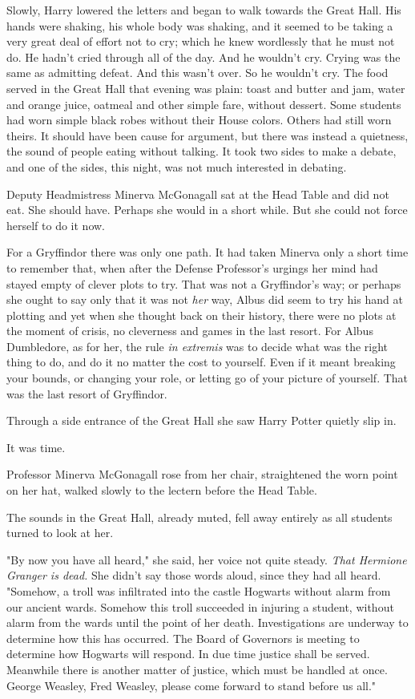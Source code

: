 Slowly, Harry lowered the letters and began to walk towards the Great Hall. His
hands were shaking, his whole body was shaking, and it seemed to be taking a
very great deal of effort not to cry; which he knew wordlessly that he must not
do. He hadn't cried through all of the day. And he wouldn't cry. Crying was the
same as admitting defeat. And this wasn't over. So he wouldn't cry.
\sbreak
The food served in the Great Hall that evening was plain: toast and
butter and jam, water and orange juice, oatmeal and other simple fare, without
dessert. Some students had worn simple black robes without their House colors.
Others had still worn theirs. It should have been cause for argument, but there
was instead a quietness, the sound of people eating without talking. It took
two sides to make a debate, and one of the sides, this night, was not much
interested in debating.

Deputy Headmistress Minerva McGonagall sat at the Head Table and did not eat.
She should have. Perhaps she would in a short while. But she could not force
herself to do it now.

For a Gryffindor there was only one path. It had taken Minerva only a short
time to remember that, when after the Defense Professor's urgings her mind had
stayed empty of clever plots to try. That was not a Gryffindor's way; or
perhaps she ought to say only that it was not \emph{her} way, Albus did seem to
try his hand at plotting{\el} and yet when she thought back on their
history, there were no plots at the moment of crisis, no cleverness and games
in the last resort. For Albus Dumbledore, as for her, the rule \emph{in
extremis} was to decide what was the right thing to do, and do it no matter the
cost to yourself. Even if it meant breaking your bounds, or changing your role,
or letting go of your picture of yourself. That was the last resort of
Gryffindor.

Through a side entrance of the Great Hall she saw Harry Potter quietly slip in.

It was time.

Professor Minerva McGonagall rose from her chair, straightened the worn point
on her hat, walked slowly to the lectern before the Head Table.

The sounds in the Great Hall, already muted, fell away entirely as all students
turned to look at her.

"By now you have all heard," she said, her voice not quite steady. \emph{That
Hermione Granger is dead.} She didn't say those words aloud, since they had all
heard. "Somehow, a troll was infiltrated into the castle Hogwarts without alarm
from our ancient wards. Somehow this troll succeeded in injuring a student,
without alarm from the wards until the point of her death. Investigations are
underway to determine how this has occurred. The Board of Governors is meeting
to determine how Hogwarts will respond. In due time justice shall be served.
Meanwhile there is another matter of justice, which must be handled at once.
George Weasley, Fred Weasley, please come forward to stand before us all."

